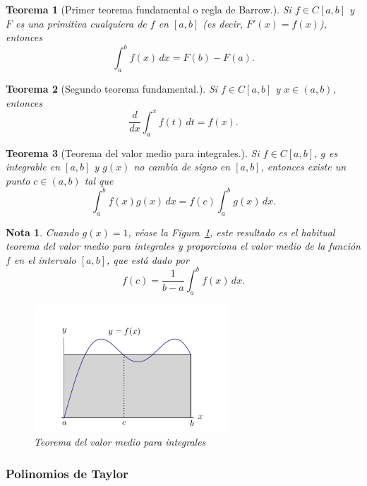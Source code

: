 \documentclass[12pt]{article}
\newtheorem{Note}{Nota}%
\newtheorem{Teo}{Teorema}
\begin{document}
\begin{Teo}[Primer teorema fundamental o regla de Barrow.]
  Si $f \in C[a, b] $ y $F $ es una primitiva cualquiera de $f $ en $[a, b] $ (es decir, $F'(x) = f(x) $), entonces $$\int_a^b f(x) \, dx = F(b) - F(a). $$
\end{Teo}

\begin{Teo}[Segundo teorema fundamental.]
  Si $f \in C[a, b] $ y $x \in (a, b) $, entonces $$\frac{d}{dx} \int_a^x f(t) \, dt = f(x).$$
\end{Teo}

\begin{Teo}[Teorema del valor medio para integrales.]
  Si $f \in C[a, b] $, $g $ es integrable en $[a, b] $ y $g(x) $ no cambia de signo en $[a, b] $, entonces existe un punto $c \in (a, b) $ tal que  $$\int_a^b f(x)g(x) \, dx = f(c) \int_a^b g(x) \, dx.$$
\end{Teo}

\begin{Note}
Cuando $g(x) = 1 $, véase la Figura~\ref{fig:valormedio-integral}, este resultado es el habitual teorema del valor medio para integrales y proporciona el valor medio de la función $f $ en el intervalo $[a, b] $, que está dado por $$f(c) = \frac{1}{b-a} \int_a^b f(x) \, dx.$$

\begin{figure}[H]
\centering
\includegraphics[width=0.65\textwidth]{Fig4.png}
\caption{Teorema del valor medio para integrales}
\label{fig:valormedio-integral}
\end{figure}
\end{Note}

\subsubsection{Polinomios de Taylor}
\end{document}
